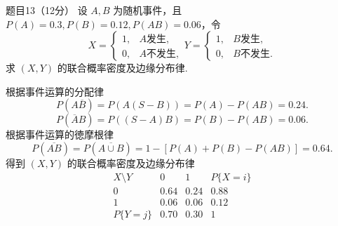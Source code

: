 \begin{question}{题目13（12分）}
    设 $A,B$ 为随机事件，且 $P(A) = 0.3, P(B) = 0.12, P(AB) = 0.06$，令
    $$
        X = \begin{cases}
            1, & A\text{发生},  \\
            0, & A\text{不发生},
        \end{cases}
        Y = \begin{cases}
            1, & B\text{发生},  \\
            0, & B\text{不发生}.
        \end{cases}
    $$
    求 $(X,Y)$ 的联合概率密度及边缘分布律.
\end{question}
\begin{solution}
    根据事件运算的分配律
    $$
        P(A\overline{B}) = P(A(S-B)) = P(A) - P(AB) = 0.24.
    $$
    $$
        P(\overline{A}B) = P((S-A)B) = P(B) - P(AB) = 0.06.
    $$
    根据事件运算的徳摩根律
    $$
        P(\overline{AB}) = P(\overline{A \cup B})
        = 1 - [P(A) + P(B) - P(AB)]
        = 0.64.
    $$
    得到 $(X,Y)$ 的联合概率密度及边缘分布律
    $$
        \begin{array}{c|cc|c}
            X \setminus Y & 0    & 1    & P\{X=i\} \\
            \hline
            0             & 0.64 & 0.24 & 0.88     \\
            1             & 0.06 & 0.06 & 0.12     \\
            \hline
            P\{Y=j\}      & 0.70 & 0.30 & 1        \\
        \end{array}
    $$
\end{solution}


